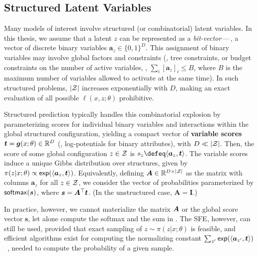 \subsection{Structured Latent Variables}\label{sec:struct_lvm_bg}

\noindent Many models of interest involve structured (or combinatorial) latent
variables. In this thesis, we assume that a latent $z$ can be represented as a
    {\it bit-vector}\,---\,\ie, a vector of discrete binary variables
$\bm{a}_{z} \in \{0, 1\}^D$. This assignment of binary variables may
involve global factors and constraints (\eg, tree constraints, or
budget constraints on the number of active variables, \ie, $\sum_i
    [\bm{a}_{z}]_i \le B$, where $B$ is the maximum number of variables
allowed to activate at the same time). In such structured problems,
$|\ZZ|$ increases exponentially with $D$, making an exact evaluation of all possible
$\ell(x, z; \theta)$ prohibitive.

Structured prediction typically handles this combinatorial explosion
by parameterizing scores for individual binary variables and
interactions within the global structured configuration, yielding a
compact vector of \textbf{variable scores} $\bm{t} = \g(x; \theta)
    \in \mathbb{R}^D$ (\eg, log-potentials for binary attributes), with
$D \ll |\ZZ|$. Then, the score of some global configuration $z \in
    \ZZ$ is $s_z \defeq \DP{\bm{a}_z}{\bm{t}}$. The variable scores
induce a unique Gibbs distribution over structures, given by
$\pi(z|x;\theta) \propto \exp(\DP{\bm{a}_{z}}{\bm{t}})$.
Equivalently, defining $\bm{A} \in \mathbb{R}^{D \times |\ZZ|}$ as
the matrix with columns $\bm{a}_{z}$ for all $z \in \ZZ$, we consider
the vector of probabilities parameterized by $\softmax(\s)$, where
$\s=\bm{A}^\top \bm{t}$. (In the unstructured case, $\bm{A}=\bm{I}$.)

In practice, however, we cannot materialize the matrix $\AA$ or the
global score vector $\bm{s}$, let alone compute the softmax and the
sum in . The SFE, however, can still be used, provided
that exact sampling of $z\sim\pi(z | x; \theta)$ is feasible, and
efficient algorithms exist for computing the normalizing constant
$\sum_{z'}\exp(\DP{\bm{a}_{z'}}{\bm{t}})$~\citep{WJ2008}, needed to
compute the probability of a given sample.
